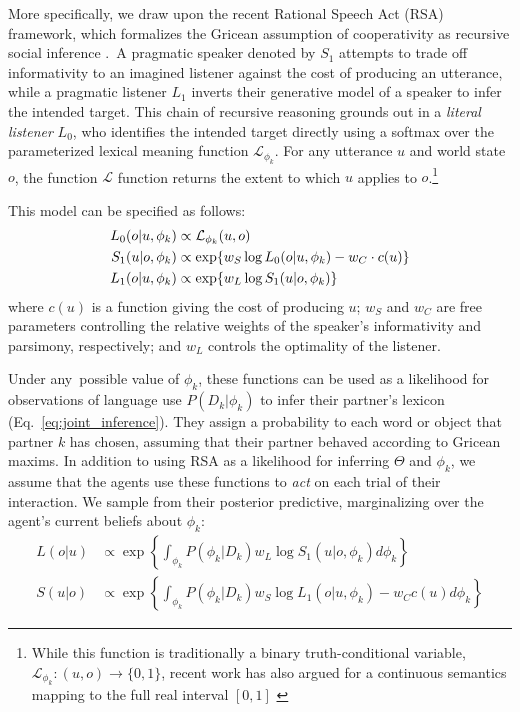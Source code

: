 More specifically, we draw upon the recent Rational Speech Act (RSA) framework, which formalizes the Gricean assumption of cooperativity as recursive social inference \cite{frank_predicting_2012,GoodmanFrank16_RSATiCS,FrankeJager16_ProbabilisticPragmatics}.~A pragmatic speaker denoted by $S_1$ attempts to trade off informativity to an imagined listener against the cost of producing an utterance, while a pragmatic listener $L_1$ inverts their generative model of a speaker to infer the intended target.
This chain of recursive reasoning grounds out in a \emph{literal listener} $L_0$, who identifies the intended target directly using a softmax over the parameterized lexical meaning function $\mathcal{L}_{\phi_k}$.
For any utterance $u$ and world state $o$, the function $\mathcal{L}$ function returns the extent to which $u$ applies to $o$.\footnote{While this function is traditionally a binary truth-conditional variable, $\mathcal{L}_{\phi_k}: (u,o) \rightarrow \{0,1\}$, recent work has also argued for a continuous semantics mapping to the full real interval $[0,1]$  \cite{degen2020redundancy}}

This model can be specified as follows:
\begin{align}
L_0(o | u, \phi_k) &\propto  \mathcal{L}_{\phi_k}(u,o)\hfill\label{eq:RSA}\\
S_1(u | o, \phi_k) &\propto   \exp\{w_S \log L_0(o | u, \phi_k) - w_C \cdot c(u)\}\nonumber   \\
L_1(o | u, \phi_k) &\propto   \exp\{w_L \log S_1(u | o, \phi_k)\}\nonumber
\end{align}
where $c(u)$ is a function giving the cost of producing $u$; $w_S$ and $w_C$ are free parameters controlling the relative weights of the speaker's informativity and parsimony, respectively; and $w_L$ controls the optimality of the listener.

Under any possible value of $\phi_k$, these functions can be used as a likelihood for observations of language use $P(D_k | \phi_k)$ to infer their partner's lexicon (Eq.~\ref{eq:joint_inference}).
They assign a probability to each word or object that partner $k$ has chosen, assuming that their partner behaved according to Gricean maxims.
In addition to using RSA as a likelihood for inferring $\Theta$ and $\phi_k$, we assume that the agents use these functions to \emph{act} on each trial of their interaction.
We sample from their posterior predictive, marginalizing over the agent's current beliefs about $\phi_k$:
\begin{align}
L(o|u) &\propto   \exp\left\{ \textstyle{\int_{\phi_k}} P(\phi_k | D_k) w_L \log S_1(u|o, \phi_k)d\phi_k\right\}\label{eq:marginalized}\\
S(u|o) &\propto  \exp\left\{ \textstyle{\int_{\phi_k}} P(\phi_k | D_k)  w_S \log L_1(o| u, \phi_k) - w_C c(u)d\phi_k\right\}\nonumber
\end{align}

